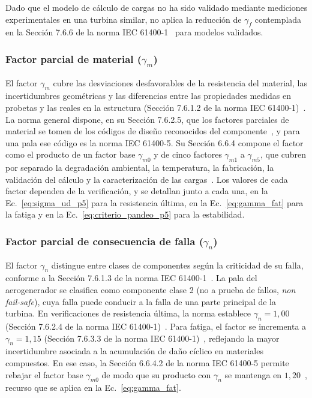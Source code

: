 Dado que el modelo de cálculo de cargas no ha sido validado mediante mediciones experimentales en una turbina similar, no aplica la reducción de $\gamma_f$ contemplada en la Sección 7.6.6 de la norma IEC 61400-1~\parencite*{IEC61400-1} para modelos validados.

\subsubsection{Factor parcial de material ($\gamma_m$)}

El factor $\gamma_m$ cubre las desviaciones desfavorables de la resistencia del material, las incertidumbres geométricas y las diferencias entre las propiedades medidas en probetas y las reales en la estructura (Sección 7.6.1.2 de la norma IEC 61400-1)~\parencite*{IEC61400-1}. La norma general dispone, en su Sección 7.6.2.5, que los factores parciales de material se tomen de los códigos de diseño reconocidos del componente~\parencite{IEC61400-1}, y para una pala ese código es la norma IEC 61400-5. Su Sección 6.6.4 compone el factor como el producto de un factor base $\gamma_{m0}$ y de cinco factores $\gamma_{m1}$ a $\gamma_{m5}$, que cubren por separado la degradación ambiental, la temperatura, la fabricación, la validación del cálculo y la caracterización de las cargas~\parencite{IEC61400-5}. Los valores de cada factor dependen de la verificación, y se detallan junto a cada una, en la Ec.~\ref{eq:sigma_ud_p5} para la resistencia última, en la Ec.~\ref{eq:gamma_fat} para la fatiga y en la Ec.~\ref{eq:criterio_pandeo_p5} para la estabilidad.

\subsubsection{Factor parcial de consecuencia de falla ($\gamma_n$)}

El factor $\gamma_n$ distingue entre clases de componentes según la criticidad de su falla, conforme a la Sección 7.6.1.3 de la norma IEC 61400-1~\parencite*{IEC61400-1}. La pala del aerogenerador se clasifica como componente clase 2 (no a prueba de fallos, \textit{non fail-safe}), cuya falla puede conducir a la falla de una parte principal de la turbina. En verificaciones de resistencia última, la norma establece $\gamma_n = 1{,}00$ (Sección 7.6.2.4 de la norma IEC 61400-1)~\parencite*{IEC61400-1}. Para fatiga, el factor se incrementa a $\gamma_n = 1{,}15$ (Sección 7.6.3.3 de la norma IEC 61400-1)~\parencite*{IEC61400-1}, reflejando la mayor incertidumbre asociada a la acumulación de daño cíclico en materiales compuestos. En ese caso, la Sección 6.6.4.2 de la norma IEC 61400-5 permite rebajar el factor base $\gamma_{m0}$ de modo que su producto con $\gamma_n$ se mantenga en $1{,}20$~\parencite*{IEC61400-5}, recurso que se aplica en la Ec.~\ref{eq:gamma_fat}.


